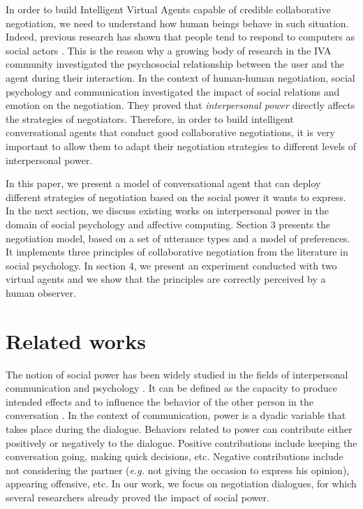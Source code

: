 \documentclass{llncs}
\begin{document}
		In order to build Intelligent Virtual Agents capable of credible collaborative negotiation, we need to understand how human beings behave in such situation. Indeed, previous research has shown that people tend to respond to computers as social actors \cite{bickmore2005establishing}. This is the reason why a growing body of research in the IVA community investigated the psychosocial relationship between the user and the agent during their interaction. In the context of human-human negotiation, social psychology and communication \cite{dunbar2005perceptions,de1995impact} investigated the impact of social relations and emotion on the negotiation. They proved that  \emph{interpersonal power} directly affects the strategies of negotiators. Therefore, in order to build intelligent conversational agents that conduct good collaborative negotiations, it is very important to allow them to adapt their negotiation strategies to different levels of interpersonal power.
		
		In this paper, we present a model of conversational agent that can deploy different strategies of negotiation based on the social power it wants to express. In the next section, we discuss existing works on interpersonal power in the domain of social psychology and affective computing. Section 3 presents the negotiation model, based on a set of utterance types and a model of preferences. It implements three principles of collaborative negotiation from the literature in social psychology. In section 4, we present an experiment conducted with two virtual agents and we show that the principles are correctly perceived by a human observer.	
		
		\section{Related works}
		The notion of social power has been widely studied in the fields of interpersonal communication and psychology \cite{kecskes2013research}. It can be defined as the capacity to produce intended effects and to influence the behavior of the other person in the conversation \cite{dunbar2005perceptions}. In the context of communication, power is a dyadic variable that takes place during the dialogue.
		Behaviors related to power can contribute either positively or negatively to the dialogue. Positive contributions include keeping the conversation going, making quick decisions, etc. Negative contributions include not considering the partner (\emph{e.g.} not giving the occasion to express his opinion), appearing offensive, etc. In our work, we focus on negotiation dialogues, for which several researchers already proved the impact of social power\cite{de2004influence,burgoonnonverbal}.
		\vspace{-1em} 
\end{document}
